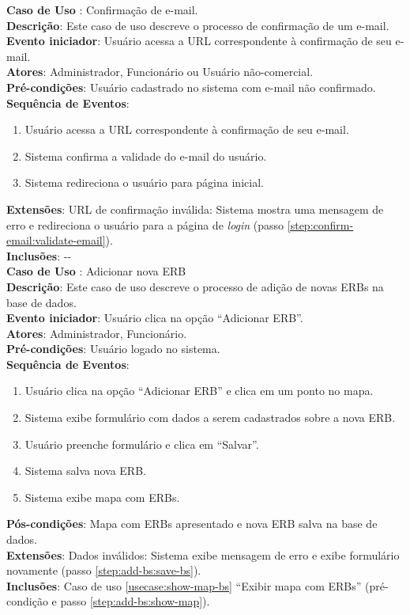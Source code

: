 \documentclass[]{politex}
\begin{document}
\noindent \textbf{Caso de Uso }: Confirmação de
e-mail. \\
\textbf{Descrição}: Este caso de uso descreve o processo de confirmação de um
e-mail. \\
\textbf{Evento iniciador}: Usuário acessa a URL correspondente à confirmação de
seu e-mail. \\
\textbf{Atores}: Administrador, Funcionário ou Usuário não-comercial. \\
\textbf{Pré-condições}: Usuário cadastrado no sistema com e-mail não
confirmado. \\
\textbf{Sequência de Eventos}:
\begin{enumerate}
\item Usuário acessa a URL correspondente à confirmação de seu e-mail.
\item\label{step:confirm-email:validate-email} Sistema confirma a validade do
e-mail do usuário.
\item Sistema redireciona o usuário para página inicial.
\end{enumerate}
\textbf{Extensões}: URL de confirmação inválida: Sistema mostra uma mensagem de
erro e redireciona o usuário para a página de \textit{login} (passo
\ref{step:confirm-email:validate-email}). \\
\textbf{Inclusões}: -{}- \\

\noindent \textbf{Caso de Uso }: Adicionar nova ERB \\
\textbf{Descrição}: Este caso de uso descreve o processo de adição de novas
ERBs na base de dados. \\
\textbf{Evento iniciador}: Usuário clica na opção ``Adicionar ERB''. \\
\textbf{Atores}: Administrador, Funcionário. \\
\textbf{Pré-condições}: Usuário logado no sistema. \\
\textbf{Sequência de Eventos}:
\begin{enumerate}
\item Usuário clica na opção ``Adicionar ERB'' e clica em um ponto no mapa.
\item Sistema exibe formulário com dados a serem cadastrados sobre a nova ERB.
\item Usuário preenche formulário e clica em ``Salvar''.
\item\label{step:add-bs:save-bs} Sistema salva nova ERB.
\item\label{step:add-bs:show-map} Sistema exibe mapa com ERBs.
\end{enumerate}
\textbf{Pós-condições}: Mapa com ERBs apresentado e nova ERB salva na base de
dados. \\
\textbf{Extensões}: Dados inválidos: Sistema exibe mensagem de erro e exibe
formulário novamente (passo \ref{step:add-bs:save-bs}). \\
\textbf{Inclusões}: Caso de uso \ref{usecase:show-map-bs} ``Exibir mapa com
ERBs'' (pré-condição e passo \ref{step:add-bs:show-map}).\\
\end{document}
